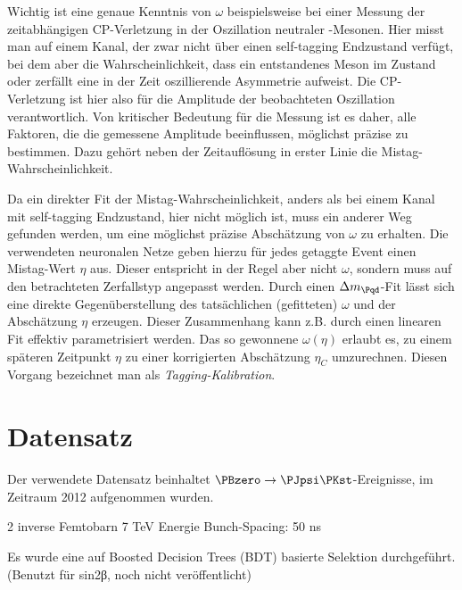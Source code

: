 Wichtig ist eine genaue Kenntnis von $ω$ beispielsweise bei einer Messung der zeitabhängigen CP-Verletzung in der Oszillation neutraler \PB-Mesonen.
Hier misst man auf einem Kanal, der zwar nicht über einen self-tagging Endzustand verfügt, bei dem aber die Wahrscheinlichkeit, dass ein entstandenes Meson im Zustand \PBz oder \PaBz zerfällt eine in der Zeit oszillierende Asymmetrie aufweist.
Die CP-Verletzung ist hier also für die Amplitude der beobachteten Oszillation verantwortlich.
Von kritischer Bedeutung für die Messung ist es daher, alle Faktoren, die die gemessene Amplitude beeinflussen, möglichst präzise zu bestimmen.
Dazu gehört neben der Zeitauflösung in erster Linie die Mistag-Wahrscheinlichkeit.

Da ein direkter Fit der Mistag-Wahrscheinlichkeit, anders als bei einem Kanal mit self-tagging Endzustand, hier nicht möglich ist, muss ein anderer Weg gefunden werden, um eine möglichst präzise Abschätzung von $ω$ zu erhalten.
Die verwendeten neuronalen Netze geben hierzu für jedes getaggte Event einen Mistag-Wert $η$ aus.
Dieser entspricht in der Regel aber nicht $ω$, sondern muss auf den betrachteten Zerfallstyp angepasst werden.
Durch einen $\difference{m_{\Pqd}}$-Fit lässt sich eine direkte Gegenüberstellung des tatsächlichen (gefitteten) $ω$ und der Abschätzung $η$ erzeugen.
Dieser Zusammenhang kann z.B. durch einen linearen Fit effektiv parametrisiert werden.
Das so gewonnene $ω(η)$ erlaubt es, zu einem späteren Zeitpunkt $η$ zu einer korrigierten Abschätzung $η_C$ umzurechnen.
Diesen Vorgang bezeichnet man als \emph{Tagging-Kalibration}.



\section{Datensatz}
\label{datensatz}

Der verwendete Datensatz beinhaltet $\PBzero \to \PJpsi\PKst$-Ereignisse, im Zeitraum 2012 aufgenommen wurden.



2 inverse Femtobarn
7 TeV Energie
Bunch-Spacing: 50 ns

Es wurde eine auf Boosted Decision Trees (BDT) basierte Selektion durchgeführt.
(Benutzt für sin2β, noch nicht veröffentlicht)

